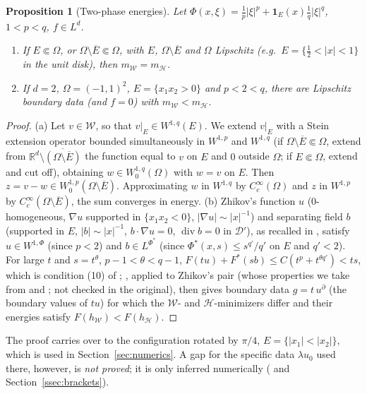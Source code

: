 \documentclass[11pt]{amsart}
\newtheorem{proposition}[theorem]{Proposition}
\theoremstyle{definition}
\theoremstyle{remark}
\numberwithin{equation}{section}
\newcommand{\R}{\mathbb{R}}
\newcommand{\abs}[1]{\lvert #1\rvert}
\newcommand{\Wc}{\mathcal W}
\newcommand{\Hc}{\mathcal H}
\newcommand{\mW}{m_{\mathcal W}}
\newcommand{\mH}{m_{\mathcal H}}
\DeclareMathOperator{\divg}{div}
\begin{document}
\begin{proposition}[Two-phase energies]\label{prop:twophase}
Let $\Phi(x,\xi)=\frac1p\abs\xi^p+\mathbf 1_E(x)\frac1q\abs\xi^q$, $1<p<q$, $f\in L^d$.
\begin{enumerate}[label=\textup{(\alph*)}]
\item If $E\Subset\Omega$, or $\Omega\setminus\overline E\Subset\Omega$, with $E$, $\Omega\setminus\overline E$ and $\Omega$ Lipschitz \textup(e.g.\ $E=\{\frac12<\abs x<1\}$ in the unit disk\textup), then $\mW=\mH$.
\item If $d=2$, $\Omega=(-1,1)^2$, $E=\{x_1x_2>0\}$ and $p<2<q$, there are Lipschitz boundary data \textup(and $f=0$\textup) with $\mW<\mH$.
\end{enumerate}
\end{proposition}
\begin{proof}
(a) Let $v\in\Wc$, so that $v|_E\in W^{1,q}(E)$. We extend $v|_E$ with a Stein extension operator bounded simultaneously in $W^{1,p}$ and $W^{1,q}$ (if $\Omega\setminus\overline E\Subset\Omega$, extend from $\R^d\setminus\overline{(\Omega\setminus\overline E)}$ the function equal to $v$ on $E$ and $0$ outside $\Omega$; if $E\Subset\Omega$, extend and cut off), obtaining $w\in W^{1,q}_0(\Omega)$ with $w=v$ on $E$. Then $z=v-w\in W^{1,p}_0(\Omega\setminus\overline E)$. Approximating $w$ in $W^{1,q}$ by $C^\infty_c(\Omega)$ and $z$ in $W^{1,p}$ by $C^\infty_c(\Omega\setminus\overline E)$, the sum converges in energy.
(b) Zhikov's function $u$ ($0$-homogeneous, $\nabla u$ supported in $\{x_1x_2<0\}$, $\abs{\nabla u}\sim\abs x^{-1}$) and separating field $b$ (supported in $E$, $\abs b\sim\abs x^{-1}$, $b\cdot\nabla u=0$, $\divg b=0$ in $\mathcal D'$), as recalled in \cite[\S1.1]{BDS2020}, satisfy $u\in W^{1,\Phi}$ (since $p<2$) and $b\in L^{\Phi^*}$ (since $\Phi^*(x,s)\le s^{q'}/q'$ on $E$ and $q'<2$). For large $t$ and $s=t^\theta$, $p-1<\theta<q-1$, $F(tu)+F^*(sb)\le C(t^p+t^{\theta q'})<ts$, which is condition (10) of \cite{BDS2020}; \cite[Thm.~28]{BDS2020}, applied to Zhikov's pair (whose properties we take from \cite[\S1.1]{BDS2020} and \cite{Zhikov1986}; not checked in the original), then gives boundary data $g=t\,u^\partial$ (the boundary values of $tu$) for which the $\Wc$- and $\Hc$-minimizers differ and their energies satisfy $F(h_{\Wc})<F(h_{\Hc})$.
\end{proof}

The proof carries over to the configuration rotated by $\pi/4$, $E=\{\abs{x_1}<\abs{x_2}\}$, which is used in Section~\ref{sec:numerics}. A gap for the specific data $\lambda u_0$ used there, however, is \emph{not proved}; it is only inferred numerically (\cite{BalciOrtnerStorn2022} and Section~\ref{ssec:brackets}).
\end{document}
